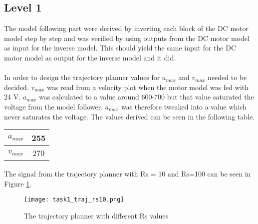 %
%
%
%
%
\subsection*{Level 1}
The model following part were derived by inverting each block of the DC motor model step by step and was verified by using outputs from the DC motor model as input for the inverse model. This should yield the same input for the DC motor model as output for the inverse model and it did. \\
\\
In order to design the trajectory planner values for $a_{max}$ and $v_{max}$ needed to be decided. $v_{max}$ was read from a velocity plot when the motor model was fed with 24 V. $a_{max}$ was calculated to a value around 600-700 but that value saturated the voltage from the model follower. $a_{max}$ was therefore tweaked into a value which never saturates the voltage. The values derived can be seen in the following table.
\begin{center}
	\begin{tabular}{| c | c |}
		\hline
		$a_{max}$ & 255 \\ \hline
		$v_{max}$ & 270 \\ 
		\hline
	\end{tabular}
\end{center}

The signal from the trajectory planner with Rs = 10 and Rs=100 can be seen in Figure \ref{fig:task2_pos}.

\begin{figure}[H]
	\begin{center}
	
		\texttt{[image: task1\_traj\_rs10.png]}
		\caption{The trajectory planner with different Rs values}
		\label{fig:task2_pos}
	\end{center}
\end{figure}


%
